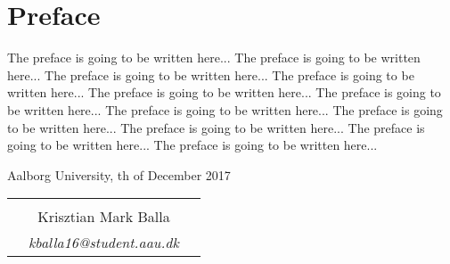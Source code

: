 \chapter*{Preface}

The preface is going to be written here... 
The preface is going to be written here... 
The preface is going to be written here... 
The preface is going to be written here... 
The preface is going to be written here... 
The preface is going to be written here... 
The preface is going to be written here... 
The preface is going to be written here... 
The preface is going to be written here... 
The preface is going to be written here... 
The preface is going to be written here... 

\hfill Aalborg University, th of December 2017




\vfill

\begin{table}[H]
	\centering
		\begin{tabular}{c c c}
			& \underline{\phantom{mmmmmmmmmmmmmmmmmmm}} 	& \\
			& Krisztian Mark Balla					& \\
			& \textit{kballa16@student.aau.dk}		& \\
		\end{tabular}
\end{table}